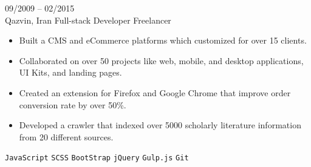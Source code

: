 \entry
{09/2009 -- 02/2015 \\ Qazvin, Iran}
{Full-stack Developer}
{Freelancer}
{\vspace{-10pt}
    \begin{itemize}[noitemsep,topsep=0pt,parsep=0pt,partopsep=0pt, leftmargin=-1pt]
        \item Built a CMS and eCommerce platforms which customized for over 15 clients.
        \item Collaborated on over 50 projects like web, mobile, and desktop applications, UI Kits, and landing pages.
        \item Created an extension for Firefox and Google Chrome that improve order conversion rate by over 50\%.
        \item Developed a crawler that indexed over 5000 scholarly literature information from 20 different sources.
    \end{itemize}
    \texttt{JavaScript} \slashsep \texttt{SCSS} \slashsep \texttt{BootStrap} \slashsep \texttt{jQuery} \slashsep \texttt{Gulp.js} \slashsep \texttt{Git}
}
